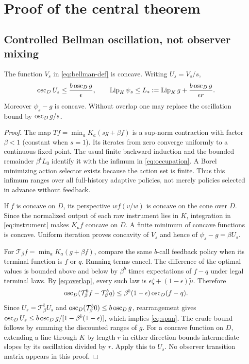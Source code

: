 \section{Proof of the central theorem}\label{sec:proof}
\subsection{Controlled Bellman oscillation, not observer mixing}
\begin{lemma}\label{lem:bellman}
The function $V_s$ in \eqref{eq:bellman-def} is concave. Writing $U_s=V_s/s$,
\begin{equation}\label{eq:span}
 \operatorname{osc}_D U_s\le \frac{b\operatorname{osc}_Dg}{\epsilon},\qquad
 \operatorname{Lip}_K\psi_s\le L_*:=\operatorname{Lip}_Kg+\frac{b\operatorname{osc}_Dg}{\epsilon r}.
\end{equation}
Moreover $\psi_s-g$ is concave. Without overlap one may replace the oscillation bound by $\operatorname{osc}_Dg/s$.
\end{lemma}
\begin{proof}
The map $Tf=\min_aK_a(sg+\beta f)$ is a sup-norm contraction with factor $\beta<1$ (constant when $s=1$). Its iterates from zero converge uniformly to a continuous fixed point. The usual finite backward induction and the bounded remainder $\beta^tL_0$ identify it with the infimum in \eqref{eq:occupation}. A Borel minimizing action selector exists because the action set is finite. Thus this infimum ranges over all full-history adaptive policies, not merely policies selected in advance without feedback.

If $f$ is concave on $D$, its perspective $w f(v/w)$ is concave on the cone over $D$. Since the normalized output of each raw instrument lies in $K$, integration in \eqref{eq:instrument} makes $K_af$ concave on $D$. A finite minimum of concave functions is concave. Uniform iteration proves concavity of $V_s$ and hence of $\psi_s-g=\beta U_s$.

For $\mathcal T_\beta f=\min_aK_a(g+\beta f)$, compare the same $b$-call feedback policy when its terminal function is $f$ or $q$. Running terms cancel. The difference of the optimal values is bounded above and below by $\beta^b$ times expectations of $f-q$ under legal terminal laws. By \eqref{eq:overlap}, every such law is $\epsilon\zeta+(1-\epsilon)\widetilde\mu$. Therefore
\[
 \operatorname{osc}_D(\mathcal T_\beta^bf-\mathcal T_\beta^bq)
 \le\beta^b(1-\epsilon)\operatorname{osc}_D(f-q).
\]
Since $U_s=\mathcal T_\beta^bU_s$ and
$\operatorname{osc}_D(\mathcal T_\beta^b0)\le b\operatorname{osc}_Dg$, rearrangement gives
$\operatorname{osc}_DU_s\le b\operatorname{osc}_Dg/[1-\beta^b(1-\epsilon)]$, which implies \eqref{eq:span}. The crude bound follows by summing the discounted ranges of $g$. For a concave function on $D$, extending a line through $K$ by length $r$ in either direction bounds intermediate slopes by its oscillation divided by $r$. Apply this to $U_s$. No observer transition matrix appears in this proof.
\end{proof}


